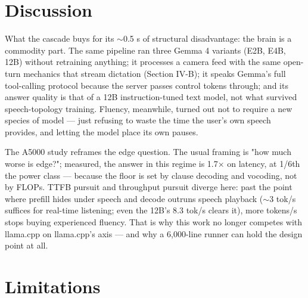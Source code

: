 \documentclass[journal]{IEEEtran}
\begin{document}
\section{Discussion}
What the cascade buys for its $\sim$0.5 s of structural disadvantage: the brain is a commodity part. The same pipeline ran three Gemma 4 variants (E2B, E4B, 12B) without retraining anything; it processes a camera feed with the same open-turn mechanics that stream dictation (Section IV-B); it speaks Gemma's full tool-calling protocol because the server passes control tokens through; and its answer quality is that of a 12B instruction-tuned text model, not what survived speech-topology training. Fluency, meanwhile, turned out not to require a new species of model — just refusing to waste the time the user's own speech provides, and letting the model place its own pauses.

The A5000 study reframes the edge question. The usual framing is "how much worse is edge?"; measured, the answer in this regime is 1.7× on latency, at 1/6th the power class — because the floor is set by clause decoding and vocoding, not by FLOPs. TTFB pursuit and throughput pursuit diverge here: past the point where prefill hides under speech and decode outruns speech playback ($\sim$3 tok/s suffices for real-time listening; even the 12B's 8.3 tok/s clears it), more tokens/s stops buying experienced fluency. That is why this work no longer competes with llama.cpp on llama.cpp's axis — and why a 6,000-line runner can hold the design point at all.

\section{Limitations}
\end{document}
